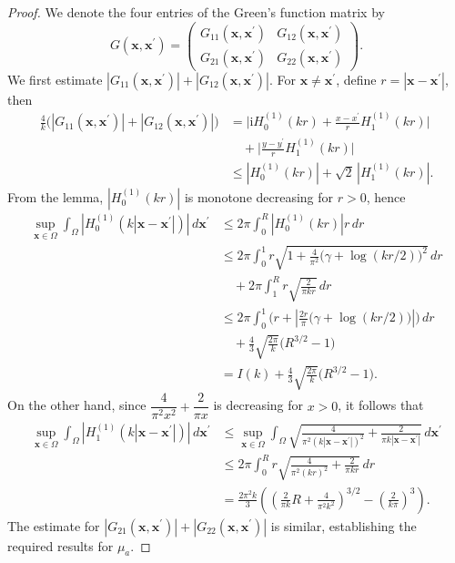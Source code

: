 \documentclass[12pt,reqno]{amsart}
\begin{document}
\begin{proof}
We denote the four entries of the Green’s function matrix by
\begin{equation*}
    G(\mathbf{x},\mathbf{x}^{\prime}) 
    = \begin{pmatrix}
        G_{11}(\mathbf{x},\mathbf{x}^{\prime}) & G_{12}(\mathbf{x},\mathbf{x}^{\prime}) \\
        G_{21}(\mathbf{x},\mathbf{x}^{\prime}) & G_{22}(\mathbf{x},\mathbf{x}^{\prime})
    \end{pmatrix}.
\end{equation*}
We first estimate 
\(|G_{11}(\mathbf{x},\mathbf{x}^{\prime})|+|G_{12}(\mathbf{x},\mathbf{x}^{\prime})|\).
For $\mathbf{x}\neq \mathbf{x}^{\prime}$, define $r=|\mathbf{x}-\mathbf{x}^{\prime}|$, then
\begin{align*}
    \frac{4}{k}\Big(|G_{11}(\mathbf{x},\mathbf{x}^{\prime})|+|G_{12}(\mathbf{x},\mathbf{x}^{\prime})|\Big)
    &=\Big|\mathrm{i}H^{(1)}_0(k r)+\frac{x-x^{\prime}}{r}H^{(1)}_1(k r)\Big| \\
    &\quad +\Big|\frac{y-y^{\prime}}{r}H^{(1)}_1(k r)\Big| \\
    &\leq |H^{(1)}_0(k r)|+\sqrt{2}\,|H^{(1)}_1(k r)|.
\end{align*}
From the lemma, $|H^{(1)}_0(k r)|$ is monotone decreasing for $r>0$, hence
\begin{align*}
    \sup_{\mathbf{x}\in\Omega}\int_{\Omega}|H^{(1)}_0(k|\mathbf{x}-\mathbf{x}^{\prime}|)|\,d \mathbf{x}^{\prime}
    &\leq2\pi\int_{0}^{R}|H^{(1)}_0(k r)|r\,dr \\
    &\leq 2\pi\int_{0}^{1}r\sqrt{1+\frac{4}{\pi^2}\big(\gamma+\log (k r / 2)\big)^2}\,dr \\
    &\quad+2\pi\int_{1}^{R}r\sqrt{\frac{2}{\pi k r}}\,dr \\
    &\leq 2\pi\int_{0}^{1}\Big(r+|\frac{2 r}{\pi}\big(\gamma+\log (k r / 2)\big)|\Big)\,dr \\
    &\quad+\frac{4}{3} \sqrt{\frac{2 \pi}{k}}\big(R^{3 / 2}-1\big)\\
    &= I(k)
    +\frac{4}{3} \sqrt{\frac{2 \pi}{k}}\big(R^{3 / 2}-1\big).
\end{align*}
On the other hand, since $\dfrac{4}{\pi^2 x^{2}}+\dfrac{2}{\pi x}$ is decreasing for $x>0$, it follows that
\begin{align*}
    \sup_{\mathbf{x}\in\Omega}\int_{\Omega}|H^{(1)}_1(k|\mathbf{x}-\mathbf{x}^{\prime}|)|\,d \mathbf{x}^{\prime}
    &\leq\sup_{\mathbf{x}\in\Omega} \int_{\Omega}\sqrt{\frac{4}{\pi^2 (k|\mathbf{x}-\mathbf{x}^{\prime}|)^{2}}+\frac{2}{\pi k|\mathbf{x}-\mathbf{x}^{\prime}|}}\,d \mathbf{x}^{\prime}\\
    &\leq 2\pi\int_{0}^{R}r\sqrt{\frac{4}{\pi^2 (k r)^{2}}+\frac{2}{\pi k r}}\,dr\\
    &=\frac{2\pi^2 k}{3}\left(\left(\frac{2}{\pi k} R+\frac{4}{\pi^2 k^2}\right)^{3 / 2}-\left(\frac{2}{k\pi}\right)^{3 }\right).
\end{align*}
The estimate for \(|G_{21}(\mathbf{x},\mathbf{x}^{\prime})|+|G_{22}(\mathbf{x},\mathbf{x}^{\prime})|\) is similar, establishing the required results for $\mu_a$. 
\end{proof}
 

\end{document}
